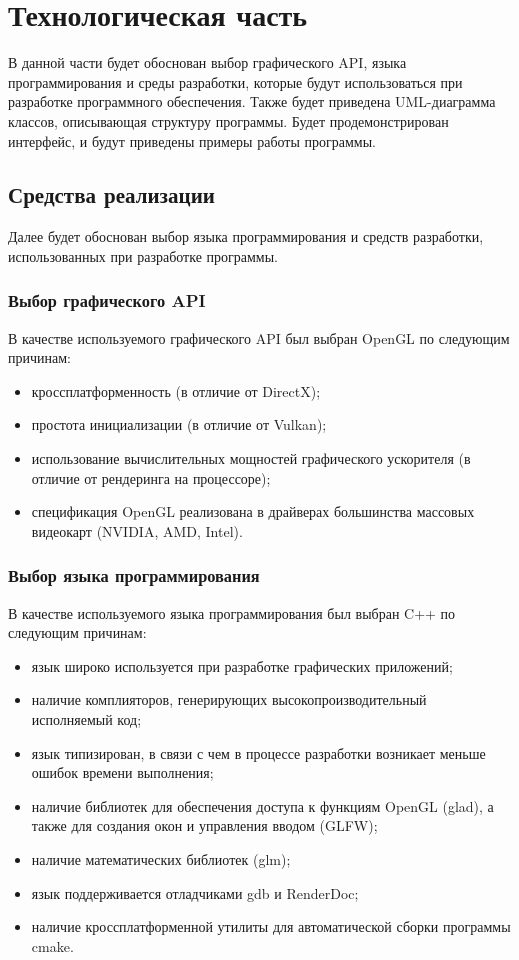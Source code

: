 \section{Технологическая часть}

В данной части будет обоснован выбор графического API, языка программирования и среды разработки, которые будут использоваться при разработке программного обеспечения.
Также будет приведена UML-диаграмма классов, описывающая структуру программы.
Будет продемонстрирован интерфейс, и будут приведены примеры работы программы.


\subsection{Средства реализации}

Далее будет обоснован выбор языка программирования и средств разработки, использованных при разработке программы.

\subsubsection{Выбор графического API}

В качестве используемого графического API был выбран OpenGL по следующим причинам:
\begin{itemize}
    \item кроссплатформенность (в отличие от DirectX);
    \item простота инициализации (в отличие от Vulkan);
    \item использование вычислительных мощностей графического ускорителя (в отличие от рендеринга на процессоре);
    \item спецификация OpenGL реализована в драйверах большинства массовых видеокарт (NVIDIA, AMD, Intel).
\end{itemize}

\subsubsection{Выбор языка программирования}

В качестве используемого языка программирования был выбран C++ по следующим причинам:
\begin{itemize}
    \item язык широко используется при разработке графических приложений;
    \item наличие комплияторов, генерирующих высокопроизводительный исполняемый код;
    \item язык типизирован, в связи с чем в процессе разработки возникает меньше ошибок времени выполнения;
    \item наличие библиотек для обеспечения доступа к функциям OpenGL (glad), а также для создания окон и управления вводом (GLFW);
    \item наличие математических библиотек (glm);
    \item язык поддерживается отладчиками gdb и RenderDoc;
    \item наличие кроссплатформенной утилиты для автоматической сборки программы cmake.
\end{itemize}


